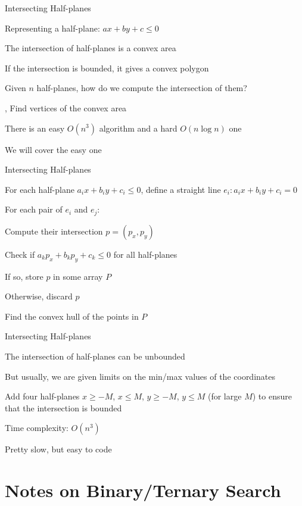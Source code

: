 \documentclass[13pt,onlymath]{beamer}
\begin{document}
\begin{frame}{Intersecting Half-planes}
\BIT
\item Representing a half-plane: $ax+by+c \le 0$
\item The intersection of half-planes is a convex area
\BIT
\item If the intersection is bounded, it gives a convex polygon
\EIT
\item Given $n$ half-planes, how do we compute the intersection of them?
\BIT
\item \ie, Find vertices of the convex area
\EIT
\item There is an easy $O(n^3)$ algorithm and a hard $O(n \log n)$ one
\BIT
\item We will cover the easy one
\EIT\EIT
\end{frame}

\begin{frame}{Intersecting Half-planes}
\BIT
\item For each half-plane $a_ix + b_iy + c_i \le 0$, define a straight line $e_i: a_ix + b_iy + c_i = 0$
\item For each pair of $e_i$ and $e_j$:
\BIT
\item Compute their intersection $p=(p_x, p_y)$
\item Check if $a_k p_x + b_k p_y + c_k \le 0$ for all half-planes
\BIT
\item If so, store $p$ in some array $P$
\item Otherwise, discard $p$
\EIT\EIT
\item Find the convex hull of the points in $P$
\EIT
\end{frame}

\begin{frame}{Intersecting Half-planes}
\BIT
\item The intersection of half-planes can be unbounded
\BIT
\item But usually, we are given limits on the min/max values of the coordinates
\item Add four half-planes $x \ge -M$, $x \le M$, $y \ge -M$, $y \le M$ (for large $M$) to ensure that the intersection is bounded
\EIT
\item Time complexity: $O(n^3)$
\BIT
\item Pretty slow, but easy to code
\EIT\EIT
\end{frame}

\section{Notes on Binary/Ternary Search}
\end{document}
